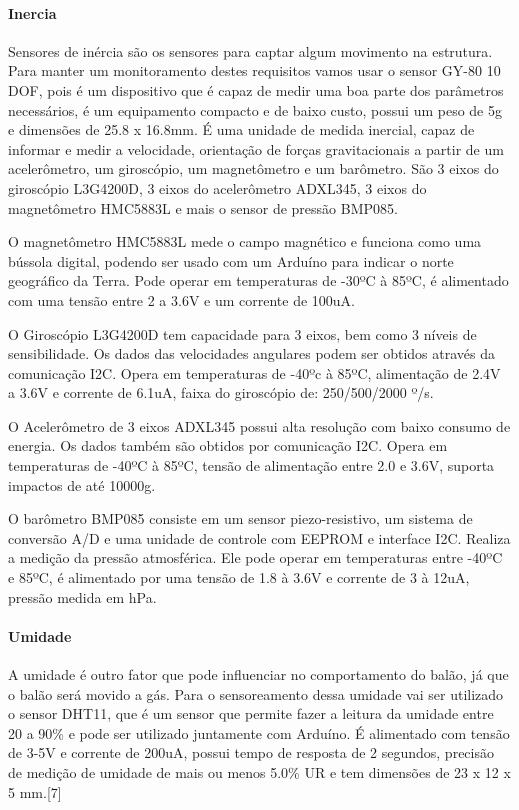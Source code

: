 \paragraph{Inercia}
	Sensores de inércia são os sensores para captar algum movimento na estrutura. Para manter um monitoramento destes requisitos vamos usar o sensor GY-80 10 DOF, pois é um dispositivo que é capaz de medir uma boa parte dos parâmetros necessários, é um equipamento compacto e de baixo custo, possui um peso de 5g e dimensões de 25.8 x 16.8mm. É uma unidade de medida inercial, capaz de informar e medir a velocidade, orientação de forças gravitacionais a partir de um acelerômetro, um giroscópio, um magnetômetro e um barômetro. São 3 eixos do giroscópio L3G4200D, 3 eixos do acelerômetro ADXL345, 3 eixos do magnetômetro HMC5883L e mais o sensor de pressão BMP085.

	O magnetômetro HMC5883L mede o campo magnético e funciona como uma bússola digital, podendo ser usado com um Arduíno para indicar o norte geográfico da Terra. Pode operar em temperaturas de -30ºC à 85ºC, é alimentado com uma tensão entre 2 a 3.6V e um corrente de 100uA.~\cite{HMC5883L}

	O Giroscópio L3G4200D tem capacidade para 3 eixos, bem como 3 níveis de sensibilidade. Os dados das velocidades angulares podem ser obtidos através da comunicação I2C. Opera em temperaturas de -40ºc à 85ºC, alimentação de 2.4V a 3.6V e corrente de 6.1uA, faixa do giroscópio de: 250/500/2000 º/s.~\cite{L3G4200D}

	O Acelerômetro de 3 eixos ADXL345 possui alta resolução com baixo consumo de energia. Os dados também são obtidos por comunicação I2C. Opera em temperaturas de -40ºC à 85ºC, tensão de alimentação entre 2.0 e 3.6V, suporta impactos de até 10000g.~\cite{ADXL345}

	O barômetro BMP085 consiste em um sensor piezo-resistivo, um sistema de conversão A/D e uma unidade de controle com EEPROM e interface I2C. Realiza a medição da pressão atmosférica. Ele pode operar em temperaturas entre -40ºC e 85ºC, é alimentado por uma tensão de 1.8 à 3.6V e corrente de 3 à 12uA, pressão medida em hPa.~\cite{BMP085}

\paragraph{Umidade}
	A umidade é outro fator que pode influenciar no comportamento do balão, já que o balão será movido a gás. Para o sensoreamento dessa umidade vai ser utilizado o sensor DHT11, que é um sensor que permite fazer a leitura da umidade entre 20 a 90\% e pode ser utilizado juntamente com Arduíno. É alimentado com tensão de 3-5V e corrente de 200uA, possui tempo de resposta de 2 segundos, precisão de medição de umidade de mais ou menos 5.0\% UR e tem dimensões de 23 x 12 x 5 mm.[7]

